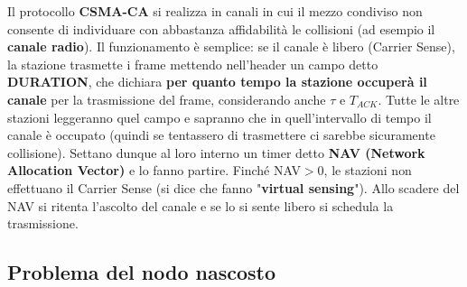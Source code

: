 \documentclass[12pt]{article}
\begin{document}
Il protocollo \textbf{CSMA-CA} si realizza in canali in cui il mezzo condiviso non consente di individuare con abbastanza affidabilità le collisioni (ad esempio il \textbf{canale radio}). Il funzionamento è semplice: se il canale è libero (Carrier Sense), la stazione trasmette i frame mettendo nell'header un campo detto \textbf{DURATION}, che dichiara \textbf{per quanto tempo la stazione occuperà il canale} per la trasmissione del frame, considerando anche $\tau$ e $T_{ACK}$. Tutte le altre stazioni leggeranno quel campo e sapranno che in quell'intervallo di tempo il canale è occupato (quindi se tentassero di trasmettere ci sarebbe sicuramente collisione). Settano dunque al loro interno un timer detto \textbf{NAV (Network Allocation Vector)} e lo fanno partire. Finché NAV$>$0, le stazioni non effettuano il Carrier Sense (si dice che fanno "\textbf{virtual sensing}"). Allo scadere del NAV si ritenta l'ascolto del canale e se lo si sente libero si schedula la trasmissione.

\subsection{Problema del nodo nascosto}
\end{document}
